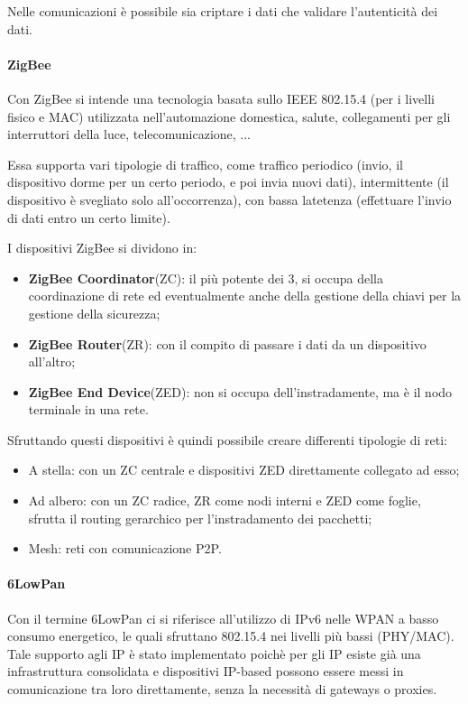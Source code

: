 Nelle comunicazioni è possibile sia criptare i dati che validare l'autenticità 
dei dati.

\paragraph{ZigBee}
Con ZigBee si intende una tecnologia basata sullo IEEE 802.15.4 (per i livelli 
fisico e MAC) utilizzata nell'automazione domestica, salute, collegamenti per 
gli interruttori della luce, telecomunicazione, ...

Essa supporta vari tipologie di traffico, come traffico periodico (invio, il 
dispositivo dorme per un certo periodo, e poi invia nuovi dati), intermittente 
(il dispositivo è svegliato solo all'occorrenza), con bassa latetenza (effettuare
 l'invio di dati entro un certo limite). 

I dispositivi ZigBee si dividono in:
\begin{itemize}
  \item \textbf{ZigBee Coordinator}(ZC): il più potente dei 3, si occupa della 
        coordinazione di rete ed eventualmente anche della gestione della chiavi 
        per la gestione della sicurezza;
  \item \textbf{ZigBee Router}(ZR): con il compito di passare i dati da un 
        dispositivo all'altro;
  \item \textbf{ZigBee End Device}(ZED): non si occupa dell'instradamente, ma è 
        il nodo terminale in una rete.
\end{itemize}

Sfruttando questi dispositivi è quindi possibile creare differenti tipologie di 
reti:
\begin{itemize}
  \item A stella: con un ZC centrale e dispositivi ZED direttamente collegato ad 
        esso;
  \item Ad albero: con un ZC radice, ZR come nodi interni e ZED come foglie, 
        sfrutta il routing gerarchico per l'instradamento dei pacchetti;
  \item Mesh: reti con comunicazione P2P.
\end{itemize}

\paragraph{6LowPan}
Con il termine 6LowPan ci si riferisce all'utilizzo di IPv6 nelle WPAN a basso 
consumo energetico, le quali sfruttano 802.15.4 nei livelli più bassi (PHY/MAC). 
Tale supporto agli IP è stato implementato poichè per gli IP esiste già una 
infrastruttura consolidata e dispositivi IP-based possono essere messi in 
comunicazione tra loro direttamente, senza la necessità di gateways o proxies.

